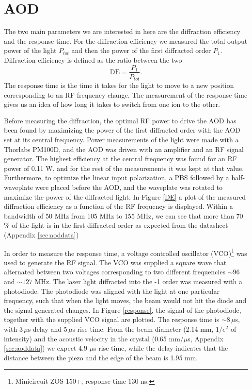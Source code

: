 \section{AOD}
\label{sec:resultaod}
The two main parameters we are interested in here are the diffraction efficiency and the response time. For the diffraction efficiency we measured the total output power of the light $P_{tot}$ and then the power of the first diffracted order $P_{1}$. Diffraction efficiency is defined as the ratio between the two
\begin{equation}
\label{eq:de}
\text{DE} = \frac{P_1}{P_{tot}}.
\end{equation}
The response time is the time it takes for the light to move to a new position corresponding to an RF frequency change. The measurement of the response time gives us an idea of how long it takes to switch from one ion to the other.\par
Before measuring the diffraction, the optimal RF power to drive the AOD has been found by maximizing the power of the first diffracted order with the AOD set at its central frequency. Power measurements of the light were made with a Thorlabs PM100D, and the AOD was driven with an amplifier and an RF signal generator. The highest efficiency at the central frequency was found for an RF power of 0.11 W, and for the rest of the measurements it was kept at that value. Furthermore, to optimize the linear input polarization, a PBS followed by a half-waveplate were placed before the AOD, and the waveplate was rotated to maximize the power of the diffracted light. In Figure \ref{DE} a plot of the measured diffraction efficiency as a function of the RF frequency is displayed. Within a bandwidth of 50 MHz from 105 MHz to 155 MHz, we can see that more than 70 \% of the light is in the first diffracted order as expected from the datasheet (Appendix \ref{sec:aoddata})\par
In order to measure the response time, a voltage controlled oscillator (VCO)\footnote{Minicircuit ZOS-150+, response time 130 ns.} was used to generate the RF signal. The VCO was supplied a square wave that alternated between two voltages corresponding to two different frequencies $\sim 96$ and $\sim 127$ MHz. The laser light diffracted into the -1 order was measured with a photodiode. The photodiode was aligned with the light at one particular frequency, such that when the light moves, the beam would not hit the diode and the signal generated changes. In Figure \ref{response}, the signal of the photodiode, together with the supplied VCO signal are plotted. The response time is $\sim 8\,\mu$s, with $3\,\mu$s delay and $5\,\mu$s rise time. From the beam diameter (2.14 mm, $1/e^2$ of intensity) and the acoustic velocity in the crystal (0.65 mm/$\mu$s, Appendix \ref{sec:aoddata}) we expect $4.9$ $\mu$s rise time, while the delay indicates that the distance between the piezo and the edge of the beam is 1.95 mm.


